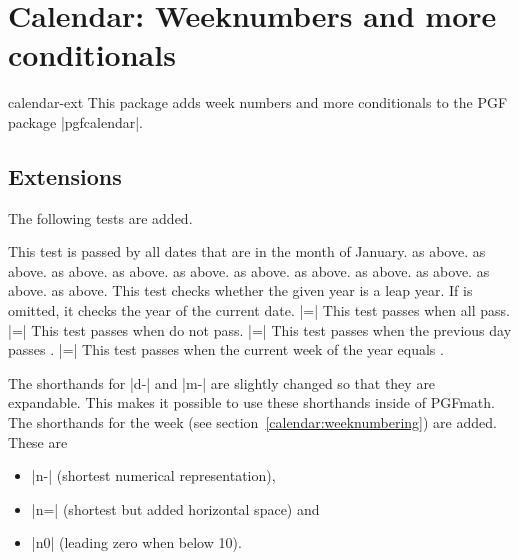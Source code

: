 %
%
%

\section{Calendar: Weeknumbers and more conditionals}
\begin{package}{calendar-ext}
  This package adds week numbers and more conditionals to the PGF package |pgfcalendar|.
\end{package}


\begin{multicols}{2}

\subsection{Extensions}

The following tests are added.
\begin{itemize}
 This test is passed by all dates that are in the month of January.
 as above.
 as above.
 as above.
 as above.
 as above.
 as above.
 as above.
 as above.
 as above.
 as above.
 as above.
    This test checks whether the given year is a leap year. If
     is omitted, it checks the year of the current date.
|=|
    This test passes when all  pass.
|=|
    This test passes when  do not pass.
|=|
    This test passes when the previous day passes .
|=|
    This test passes when the current week of the year equals .
\end{itemize}

The shorthands for |d-| and |m-| are slightly changed so that they are
expandable. This makes it possible to use these shorthands inside of PGFmath.
The shorthands for the week (see section~\ref{calendar:weeknumbering})
are added. These are
\begin{itemize}
\item |n-| (shortest numerical representation),
\item |n=| (shortest but added horizontal space) and
\item |n0| (leading zero when below 10).
\end{itemize}


\end{multicols}
